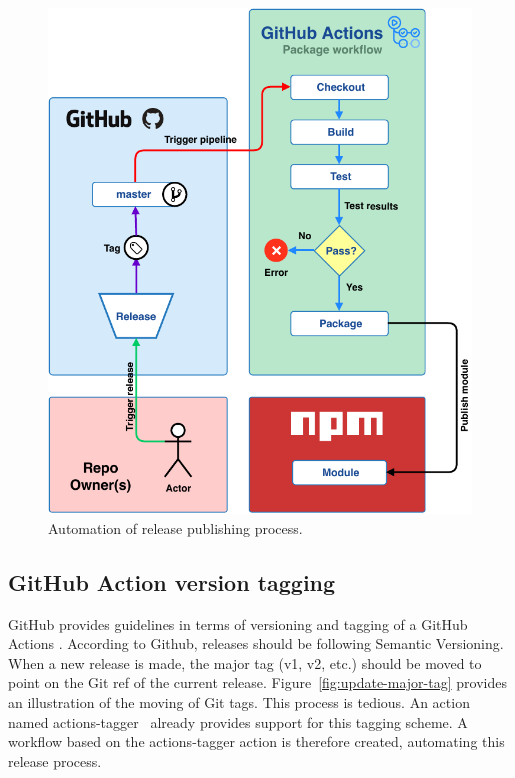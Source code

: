 \begin{figure}[hp]
    \setlength{\abovecaptionskip}{25pt}
    \centering
    \includegraphics[page=1,scale=1]{sections/methodology/figures/package-release-automation.pdf}
    \caption{Automation of release publishing process.}
    \label{fig:release-automation}
\end{figure}

\subsection{GitHub Action version tagging}
GitHub provides guidelines in terms of versioning and tagging of a GitHub Actions \cite{github-actions-versioning}. According to Github, releases should be following Semantic Versioning. When a new release is made, the major tag (v1, v2, etc.) should be moved to point on the Git ref of the current release. Figure~\ref{fig:update-major-tag} provides an illustration of the moving of Git tags. This process is tedious. An action named actions-tagger~\cite{actions-tagger} already provides support for this tagging scheme. A workflow based on the actions-tagger action is therefore created, automating this release process.

